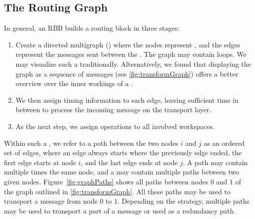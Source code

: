 \subsection{The Routing Graph}\label{sec:routingGraph}
In general, an RBB builds a routing block in three stages:
\begin{enumerate}
	\item Create a directed multigraph () where the nodes represent \VortexNodes, and the edges represent the messages sent between the \VortexNodes. The graph may contain loops. We may visualize such a  traditionally. Alternatively, we found that displaying the graph as a sequence of messages (see \cref{fig:transformGraph}) offers a better overview over the inner workings of a .
	\item We then assign timing information to each edge, leaving sufficient time in between to process the incoming message on the transport layer.
	\item As the next step, we assign operations to all involved workspaces.
\end{enumerate}

Within such a , we refer to a path between the two nodes $i$ and $j$ as an ordered set of edges, where an edge always starts where the previously edge ended, the first edge starts at node $i$, and the last edge ends at node $j$. A path may contain multiple times the same node, and a  may contain multiple paths between two given nodes.  Figure~\ref{fig:graphPaths} shows all paths between nodes $0$ and $1$ of the graph outlined in \cref{fig:transformGraph}. All these paths may be used to transport a message from node $0$ to $1$. Depending on the strategy, multiple paths may be used to transport a part of a message or used as a redundancy path.

\begin{figure*}[ht]
	\centering
	\resizebox{.95\linewidth}{!}{
		
	}
	\caption{Transformation of a graph into a sequence of messages}
	\label{fig:transformGraph}
\end{figure*}

\begin{figure*}[ht]
	\centering
	\resizebox{.9\linewidth}{!}{
		
	}
	\caption{A graph containing six paths between node $0$ and node $1$}\label{fig:graphPaths}
\end{figure*}

